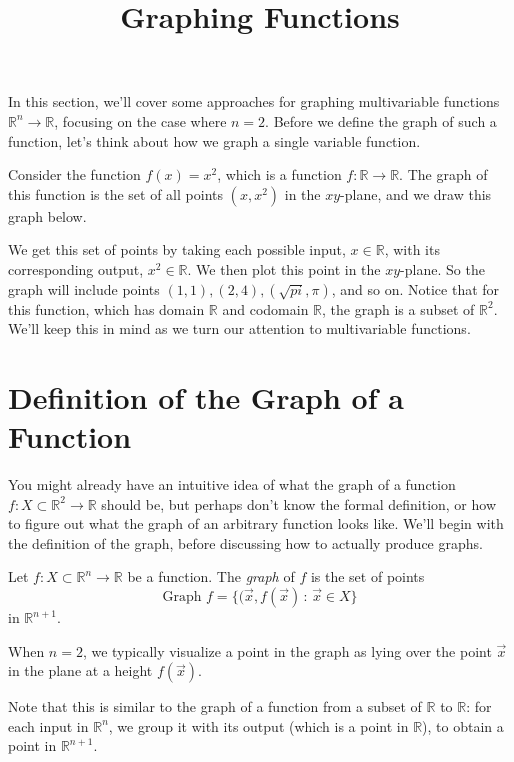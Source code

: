 \documentclass{ximera}
\title{Graphing Functions}
\begin{document}
\begin{abstract}
\end{abstract}
\maketitle

In this section, we'll cover some approaches for graphing multivariable functions $\mathbb{R}^n\rightarrow\mathbb{R}$, focusing on the case where $n=2$. Before we define the graph of such a function, let's think about how we graph a single variable function.

Consider the function $f(x) = x^2$, which is a function $f:\mathbb{R}\rightarrow\mathbb{R}$. The graph of this function is the set of all points $(x,x^2)$ in the $xy$-plane, and we draw this graph below.


We get this set of points by taking each possible input, $x\in\mathbb{R}$, with its corresponding output, $x^2\in\mathbb{R}$. We then plot this point in the $xy$-plane. So the graph will include points $(1,1), (2,4), (\sqrt{pi}, \pi)$, and so on. Notice that for this function, which has domain $\mathbb{R}$ and codomain $\mathbb{R}$, the graph is a subset of $\mathbb{R}^2$. We'll keep this in mind as we turn our attention to multivariable functions.

\section*{Definition of the Graph of a Function}

You might already have an intuitive idea of what the graph of a function $f:X\subset\mathbb{R}^2\rightarrow\mathbb{R}$ should be, but perhaps don't know the formal definition, or how to figure out what the graph of an arbitrary function looks like. We'll begin with the definition of the graph, before discussing how to actually produce graphs.

\begin{definition}
Let $f:X\subset\mathbb{R}^n\rightarrow\mathbb{R}$ be a function. The \emph{graph} of $f$ is the set of points
\[
\textrm{Graph }f = \{(\vec{x},f(\vec{x})\,:\,\vec{x}\in X\}
\]
in $\mathbb{R}^{n+1}$.

When $n=2$, we typically visualize a point in the graph as lying over the point $\vec{x}$ in the plane at a height $f(\vec{x})$.
\end{definition}

Note that this is similar to the graph of a function from a subset of $\mathbb{R}$ to $\mathbb{R}$: for each input in $\mathbb{R}^n$, we group it with its output (which is a point in $\mathbb{R}$), to obtain a point in $\mathbb{R}^{n+1}$.
\end{document}
